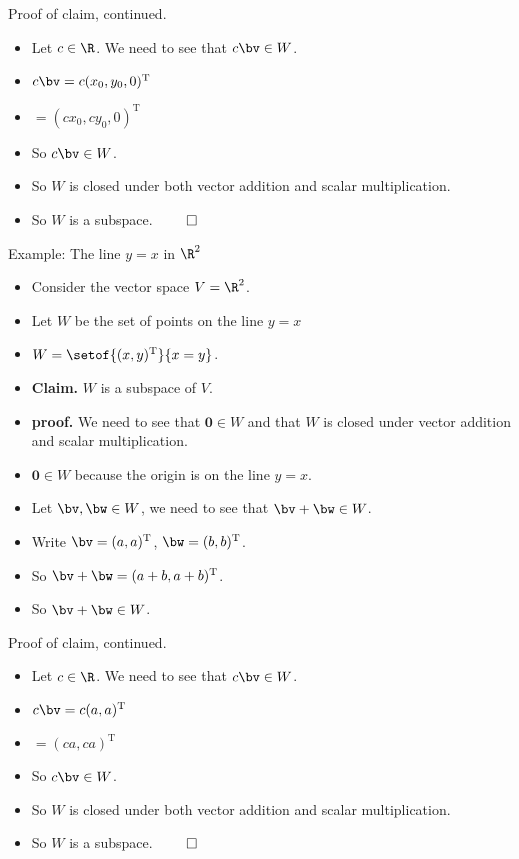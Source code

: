 \documentclass{beamer}
\begin{document}
\begin{frame}{Proof of claim, continued.}

\begin{itemize}
\item Let $c\in \R$. We need to see that $c \bv\in W$.
\item $c\bv = c(x_0, y_0, 0)^{\text{T}}$
\item $=(cx_0, cy_0, 0)^{\text{T}}$
\item So $c\bv\in W$.
\item So $W$ is closed under both vector addition and scalar multiplication.
\item So $W$ is a subspace. $\qed$
\end{itemize}
\end{frame}

\begin{frame}{Example: The line $y=x$ in $\R^2$}

\begin{itemize}
\item Consider the vector space $V = \R^2$.
\item Let $W$ be the set of points on the line $y=x$
\item $W=\setof{(x,y)^{\text{T}}}{x=y}$.
\item \textbf{Claim.} $W$ is a subspace of $V$.
\item \textbf{proof.} We need to see that $\textbf{0}\in W$ and that
$W$ is closed under vector
addition and scalar multiplication.
\item $\textbf{0} \in W$ because the origin is on the line $y=x$.
\item Let $\bv,\bw\in W$, we need to see that $\bv+\bw\in W$.
\item Write $\bv=(a,a)^{\text{T}}$, $\bw = (b,b)^{\text{T}}$.
\item So $\bv+\bw = (a+b,a+b)^{\text{T}}$.
\item So $\bv+\bw \in W$.
\end{itemize}
\end{frame}


\begin{frame}{Proof of claim, continued.}

\begin{itemize}
\item Let $c\in \R$. We need to see that $c \bv\in W$.
\item $c\bv = c(a,a)^{\text{T}}$
\item $=(ca,ca)^{\text{T}}$
\item So $c\bv\in W$.
\item So $W$ is closed under both vector addition and scalar multiplication.
\item So $W$ is a subspace. $\qed$
\end{itemize}
\end{frame}
\end{document}
